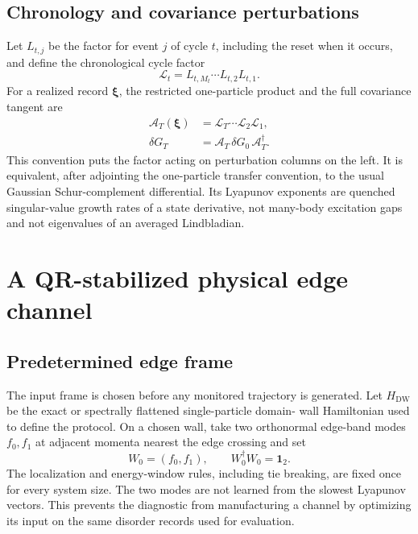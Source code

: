 \documentclass[aps,prb,onecolumn,nofootinbib,superscriptaddress]{revtex4-2}
\newcommand{\I}{\mathbf{1}}
\newcommand{\cA}{\mathcal{A}}
\newcommand{\cL}{\mathcal{L}}
\newcommand{\bxi}{\boldsymbol{\xi}}
\begin{document}
\subsection{Chronology and covariance perturbations}

Let $L_{t,j}$ be the factor for event $j$ of cycle $t$, including the reset
when it occurs, and define the chronological cycle factor
\begin{equation}
 \cL_t=L_{t,M_t}\cdots L_{t,2}L_{t,1}.
 \label{eq:cycle-factor}
\end{equation}
For a realized record $\bxi$, the restricted one-particle product and the full
covariance tangent are
\begin{align}
 \cA_T(\bxi)&=\cL_T\cdots\cL_2\cL_1,
 \label{eq:chronological-product}\\
 \delta G_T&=\cA_T\,\delta G_0\,\cA_T^\dagger .
 \label{eq:covariance-tangent}
\end{align}
This convention puts the factor acting on perturbation columns on the left.
It is equivalent, after adjointing the one-particle transfer convention, to
the usual Gaussian Schur-complement differential.  Its Lyapunov exponents are
quenched singular-value growth rates of a state derivative, not many-body
excitation gaps and not eigenvalues of an averaged Lindbladian.

\section{A QR-stabilized physical edge channel}
\label{sec:edge-channel}

\subsection{Predetermined edge frame}

The input frame is chosen before any monitored trajectory is generated.  Let
$H_{\mathrm{DW}}$ be the exact or spectrally flattened single-particle domain-
wall Hamiltonian used to define the protocol.  On a chosen wall, take two
orthonormal edge-band modes $f_0,f_1$ at adjacent momenta nearest the edge
crossing and set
\begin{equation}
 W_0=(f_0,f_1),\qquad W_0^\dagger W_0=\I_2.
 \label{eq:initial-frame}
\end{equation}
The localization and energy-window rules, including tie breaking, are fixed
once for every system size.  The two modes are not learned from the slowest
Lyapunov vectors.  This prevents the diagnostic from manufacturing a channel
by optimizing its input on the same disorder records used for evaluation.
\end{document}
